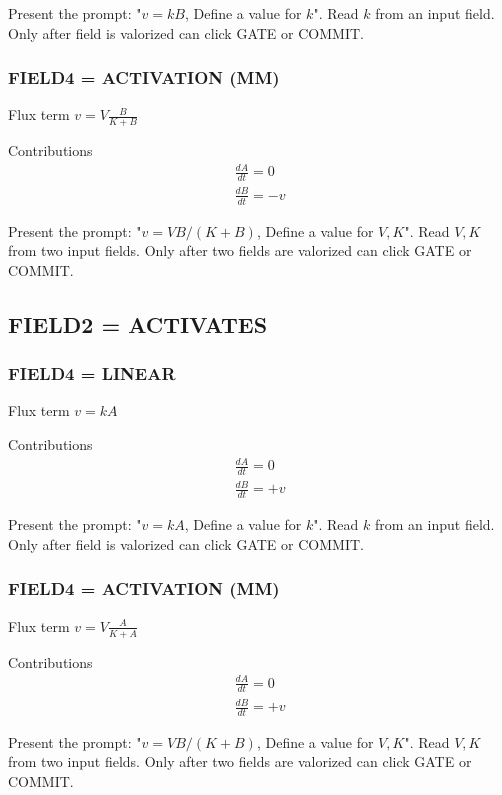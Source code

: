 \documentclass[11pt, oneside]{article}
\begin{document}
Present the prompt: "$v = kB$, Define a value for $k$". Read $k$ from an input field.
Only after field is valorized can click GATE or COMMIT.


\subsubsection{FIELD4 = ACTIVATION (MM)}

Flux term $v = V \tfrac{ B }{ K + B}$ 

Contributions
\begin{align}
\frac{dA}{dt} = 0 \\
\frac{dB}{dt} = -v
\end{align}

Present the prompt: "$v = V B/(K+B)$, Define a value for $V,K$". Read $V,K$ from two input fields.
Only after two fields are valorized can click GATE or COMMIT.


\subsection{FIELD2 = ACTIVATES}

\subsubsection{FIELD4 = LINEAR}

Flux term $v = kA$ 

Contributions
\begin{align}
\frac{dA}{dt} = 0 \\
\frac{dB}{dt} = +v 
\end{align}

Present the prompt: "$v = kA$, Define a value for $k$". Read $k$ from an input field.
Only after field is valorized can click GATE or COMMIT.


\subsubsection{FIELD4 = ACTIVATION (MM)}

Flux term $v = V \tfrac{ A }{ K + A }$ 

Contributions
\begin{align}
\frac{dA}{dt} = 0 \\
\frac{dB}{dt} = +v
\end{align}

Present the prompt: "$v = V B/(K+B)$, Define a value for $V,K$". Read $V,K$ from two input fields.
Only after two fields are valorized can click GATE or COMMIT.
\end{document}
